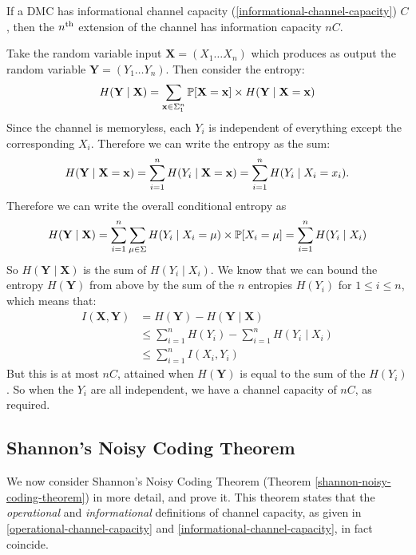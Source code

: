 \documentclass{article}
\begin{document}
\begin{proposition}
	\label{scalar-capacity-of-extension}
    If a DMC has informational channel capacity
    (\ref{informational-channel-capacity})
	$C$, then the $n\th$ extension of the channel has information capacity $nC$.
\end{proposition}
\begin{prf}
    Take the random variable input $\mathbf X = (X_1 \dots X_n)$
    which produces as output the random variable $\mathbf Y = (Y_1 \dots Y_n)$.
    Then consider the entropy:
    \[
	H(\mathbf Y \mid \mathbf X) =
	\sum_{\x \in \Sigma_1^n} \P[\mathbf X = \x]
	\times
	H(\mathbf Y \mid \mathbf X = \x)
	\]
	Since the channel is memoryless,
	each $Y_i$ is independent of everything except the corresponding $X_i$.
	Therefore we can write the entropy as the sum:
	\[
	H(\mathbf Y \mid \mathbf X = \x) =
	\sum_{i=1}^n H(Y_i \mid \mathbf X = \x) =
	\sum_{i=1}^n H(Y_i \mid X_i = x_i).
	\]
	Therefore we can write the overall conditional entropy as
	\[
	H(\mathbf Y \mid \mathbf X) =
	\sum_{i=1}^n \sum_{\mu \in \Sigma}
	H(Y_i \mid X_i = \mu) \times \P[X_i = \mu] =
	\sum_{i=1}^n H(Y_i \mid X_i)
	\]
	So $H(\mathbf Y \mid \mathbf X)$ is the sum of $H(Y_i \mid X_i)$.
	We know that we can bound the entropy $H(\mathbf Y)$ from above
	by the sum of the $n$ entropies $H(Y_i)$ for $1 \leq i \leq n$,
	which means that:
	\begin{align*}
		I(\mathbf X, \mathbf Y) &= H(\mathbf Y) - H(\mathbf Y \mid \mathbf X) \\
		&\leq \sum_{i=1}^n H(Y_i) - \sum_{i=1}^n H(Y_i \mid X_i) \\
		&\leq \sum_{i=1}^n I(X_i, Y_i) 
	\end{align*}
	But this is at most $nC$,
	attained when $H(\mathbf Y)$ is equal to the sum of the $H(Y_i)$.
	So when the $Y_i$ are all independent,
	we have a channel capacity of $nC$, as required.
\end{prf}


\subsection{Shannon's Noisy Coding Theorem}
\label{shannon-noisy-coding-theorem-proofs}

We now consider Shannon's Noisy Coding Theorem
(Theorem \ref{shannon-noisy-coding-theorem})
in more detail, and prove it. This theorem states that
the \textit{operational} and \textit{informational} definitions of channel capacity,
as given in \ref{operational-channel-capacity}
and \ref{informational-channel-capacity},
in fact coincide.
\end{document}
